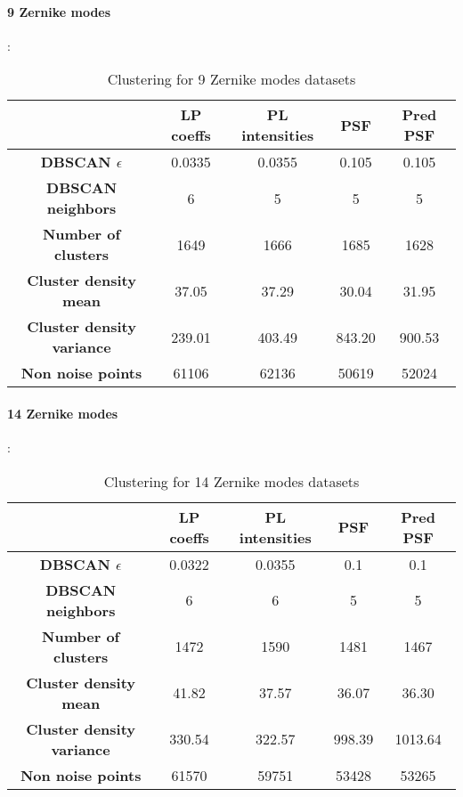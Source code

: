 		\paragraph{9 Zernike modes}:
		\begin{table}[h!]
			\centering
			\begin{tabular}{|c|c|c|c|c|}
				\hline
				\textbf{} & \textbf{LP coeffs} & \textbf{PL intensities} & \textbf{PSF} & \textbf{Pred PSF}\\
				\hline
				\textbf{DBSCAN $\epsilon$} & 0.0335 & 0.0355 & 0.105 & 0.105\\
				\hline
				\textbf{DBSCAN neighbors} & 6 & 5 & 5 & 5\\
				\hline
				\textbf{Number of clusters} & 1649 & 1666 & 1685 & 1628\\
				\hline
				\textbf{Cluster density mean} & 37.05 & 37.29 & 30.04 & 31.95\\
				\hline
				\textbf{Cluster density variance} & 239.01 & 403.49 & 843.20 & 900.53 \\
				\hline
				\textbf{Non noise points} & 61106 & 62136 & 50619 & 52024\\
				\hline
			\end{tabular}
		\caption{Clustering for 9 Zernike modes datasets}
		\end{table}
		\FloatBarrier
		
		\paragraph{14 Zernike modes}:
		\begin{table}[h!]
			\centering
			\begin{tabular}{|c|c|c|c|c|}
				\hline
				\textbf{} & \textbf{LP coeffs} & \textbf{PL intensities} & \textbf{PSF} & \textbf{Pred PSF}\\
				\hline
				\textbf{DBSCAN $\epsilon$} & 0.0322 & 0.0355 & 0.1 & 0.1\\
				\hline
				\textbf{DBSCAN neighbors} & 6 & 6 & 5 & 5\\
				\hline
				\textbf{Number of clusters} & 1472 & 1590 & 1481 & 1467\\
				\hline
				\textbf{Cluster density mean} & 41.82 & 37.57 & 36.07 & 36.30\\
				\hline
				\textbf{Cluster density variance} & 330.54 & 322.57 & 998.39 & 1013.64\\
				\hline
				\textbf{Non noise points} & 61570 & 59751 & 53428 & 53265\\
				\hline
			\end{tabular}
		\caption{Clustering for 14 Zernike modes datasets}
		\end{table}
		\FloatBarrier
		
